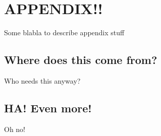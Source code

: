 \chapter{APPENDIX!!}
\label{ap:sometext}

Some blabla to describe appendix stuff

\section{Where does this come from?}
Who needs this anyway?

\section{HA! Even more!}
Oh no!